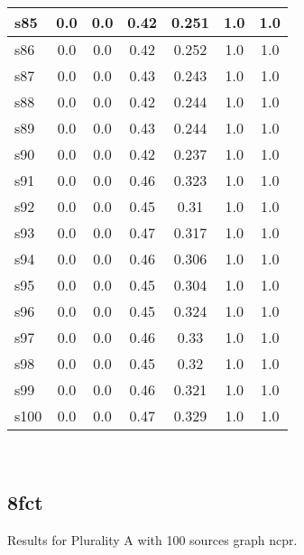 \documentclass{article}
\begin{document}
\begin{tabular}{|l|c|c|c|c|c|c|}
\hline
s85 &0.0 & 0.0 & 0.42 & 0.251 & 1.0 & 1.0\\
\hline
s86 &0.0 & 0.0 & 0.42 & 0.252 & 1.0 & 1.0\\
\hline
s87 &0.0 & 0.0 & 0.43 & 0.243 & 1.0 & 1.0\\
\hline
s88 &0.0 & 0.0 & 0.42 & 0.244 & 1.0 & 1.0\\
\hline
s89 &0.0 & 0.0 & 0.43 & 0.244 & 1.0 & 1.0\\
\hline
s90 &0.0 & 0.0 & 0.42 & 0.237 & 1.0 & 1.0\\
\hline
s91 &0.0 & 0.0 & 0.46 & 0.323 & 1.0 & 1.0\\
\hline
s92 &0.0 & 0.0 & 0.45 & 0.31 & 1.0 & 1.0\\
\hline
s93 &0.0 & 0.0 & 0.47 & 0.317 & 1.0 & 1.0\\
\hline
s94 &0.0 & 0.0 & 0.46 & 0.306 & 1.0 & 1.0\\
\hline
s95 &0.0 & 0.0 & 0.45 & 0.304 & 1.0 & 1.0\\
\hline
s96 &0.0 & 0.0 & 0.45 & 0.324 & 1.0 & 1.0\\
\hline
s97 &0.0 & 0.0 & 0.46 & 0.33 & 1.0 & 1.0\\
\hline
s98 &0.0 & 0.0 & 0.45 & 0.32 & 1.0 & 1.0\\
\hline
s99 &0.0 & 0.0 & 0.46 & 0.321 & 1.0 & 1.0\\
\hline
s100 &0.0 & 0.0 & 0.47 & 0.329 & 1.0 & 1.0\\
\hline
\end{tabular}\\

\newpage

\subsection{8fct}

\noindent Results for Plurality A with 100 sources graph ncpr.
\end{document}
